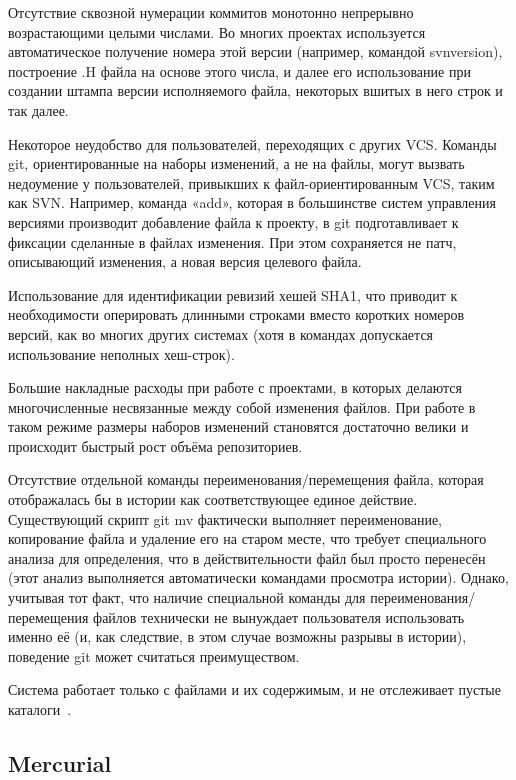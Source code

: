 \documentclass{../industrial-development}
\begin{document}
\lecturenotes

Отсутствие сквозной нумерации коммитов монотонно непрерывно возрастающими целыми числами. Во многих проектах используется автоматическое получение номера этой версии (например, командой svnversion), построение .H файла на основе этого числа, и далее его использование при создании штампа версии исполняемого файла, некоторых вшитых в него строк и так далее.

Некоторое неудобство для пользователей, переходящих с других VCS. Команды git, ориентированные на наборы изменений, а не на файлы, могут вызвать недоумение у пользователей, привыкших к файл-ориентированным VCS, таким как SVN. Например, команда «add», которая в большинстве систем управления версиями производит добавление файла к проекту, в git подготавливает к фиксации сделанные в файлах изменения. При этом сохраняется не патч, описывающий изменения, а новая версия целевого файла.

Использование для идентификации ревизий хешей SHA1, что приводит к необходимости оперировать длинными строками вместо коротких номеров версий, как во многих других системах (хотя в командах допускается использование неполных хеш-строк).

Большие накладные расходы при работе с проектами, в которых делаются многочисленные несвязанные между собой изменения файлов. При работе в таком режиме размеры наборов изменений становятся достаточно велики и происходит быстрый рост объёма репозиториев.

Отсутствие отдельной команды переименования/перемещения файла, которая отображалась бы в истории как соответствующее единое действие. Существующий скрипт git mv фактически выполняет переименование, копирование файла и удаление его на старом месте, что требует специального анализа для определения, что в действительности файл был просто перенесён (этот анализ выполняется автоматически командами просмотра истории). Однако, учитывая тот факт, что наличие специальной команды для переименования/перемещения файлов технически не вынуждает пользователя использовать именно её (и, как следствие, в этом случае возможны разрывы в истории), поведение git может считаться преимуществом.

Система работает только с файлами и их содержимым, и не отслеживает пустые каталоги~\cite{GitWikipedia}.

\subsection{Mercurial}
\end{document}
